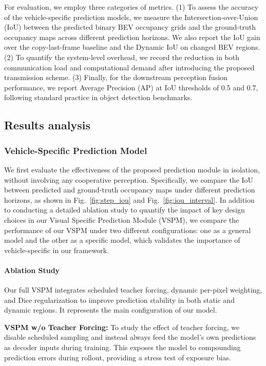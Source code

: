 For evaluation, we employ three categories of metrics. (1) To assess the accuracy of the vehicle-specific prediction models, we measure the Intersection-over-Union (IoU) between the predicted binary BEV occupancy grids and the ground-truth occupancy maps across different prediction horizons. We also report the IoU gain over the copy-last-frame baseline and the Dynamic IoU on changed BEV regions. (2) To quantify the system-level overhead, we record the reduction in both communication load and computational demand after introducing the proposed transmission scheme. (3) Finally, for the downstream perception fusion performance, we report Average Precision (AP) at IoU thresholds of 0.5 and 0.7, following standard practice in object detection benchmarks.
 



\subsection{Results analysis}
\subsubsection{\textbf{Vehicle-Specific Prediction Model}}
We first evaluate the effectiveness of the proposed prediction module in isolation, without involving any cooperative perception. Specifically, we compare the IoU between predicted and ground-truth occupancy maps under different prediction horizons, as shown in Fig.~\ref{fig:step_iou} and Fig.~\ref{fig:iou_interval}. In addition to conducting a detailed ablation study to quantify the impact of key design choices in our Visual Specific Prediction Module (VSPM), we compare the performance of our VSPM under two different configurations: one as a general model and the other as a specific model, which validates the importance of vehicle-specific in our framework.


\paragraph{Ablation Study}


Our full VSPM integrates scheduled teacher forcing, dynamic per-pixel weighting, and Dice regularization to improve prediction stability in both static and dynamic regions. It represents the main configuration of our model.

\textbf{VSPM w/o Teacher Forcing:}
To study the effect of teacher forcing, we disable scheduled sampling and instead always feed the model's own predictions as decoder inputs during training. This exposes the model to compounding prediction errors during rollout, providing a stress test of exposure bias.

